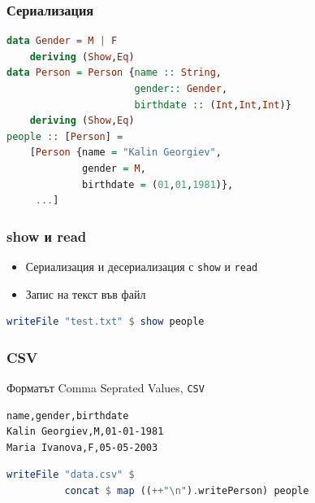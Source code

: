 \documentclass{beamer}
\begin{document}
\begin{frame}[fragile]
  \frametitle{Сериализация}

\begin{lstlisting}[basicstyle=\small,language=Haskell]
data Gender = M | F
    deriving (Show,Eq)
data Person = Person {name :: String, 
                      gender:: Gender, 
                      birthdate :: (Int,Int,Int)}
    deriving (Show,Eq)
people :: [Person] = 
    [Person {name = "Kalin Georgiev", 
             gender = M, 
             birthdate = (01,01,1981)},
     ...]
\end{lstlisting}

\end{frame}


\begin{frame}[fragile]
  \frametitle{show и read}

\begin{itemize}
  \item Сериализация и десериализация с \verb#show# и \verb#read#
  \item Запис на текст във файл
\end{itemize}

\bigskip

\begin{lstlisting}[basicstyle=\small,language=Haskell]
writeFile "test.txt" $ show people
\end{lstlisting}

\end{frame}


\begin{frame}[fragile]
  \frametitle{CSV}

Форматът Comma Seprated Values, \verb#CSV#

\begin{verbatim}
name,gender,birthdate
Kalin Georgiev,M,01-01-1981
Maria Ivanova,F,05-05-2003
\end{verbatim}

\begin{lstlisting}[basicstyle=\small,language=Haskell]
writeFile "data.csv" $ 
          concat $ map ((++"\n").writePerson) people
\end{lstlisting}


\end{frame}
\end{document}
